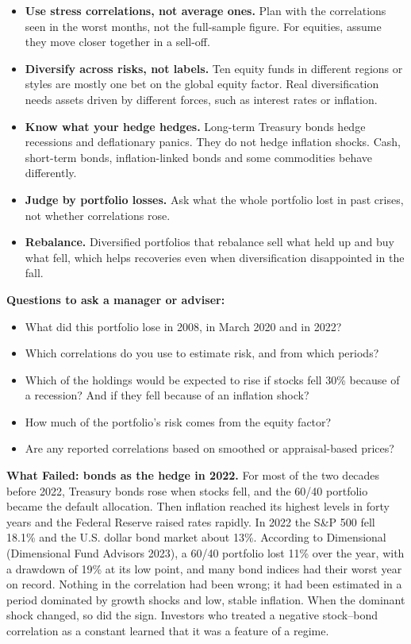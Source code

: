 \begin{itemize}
  \item \textbf{Use stress correlations, not average ones.} Plan with the correlations seen in the worst months, not the full-sample figure. For equities, assume they move closer together in a sell-off.
  \item \textbf{Diversify across risks, not labels.} Ten equity funds in different regions or styles are mostly one bet on the global equity factor. Real diversification needs assets driven by different forces, such as interest rates or inflation.
  \item \textbf{Know what your hedge hedges.} Long-term Treasury bonds hedge recessions and deflationary panics. They do not hedge inflation shocks. Cash, short-term bonds, inflation-linked bonds and some commodities behave differently.
  \item \textbf{Judge by portfolio losses.} Ask what the whole portfolio lost in past crises, not whether correlations rose.
  \item \textbf{Rebalance.} Diversified portfolios that rebalance sell what held up and buy what fell, which helps recoveries even when diversification disappointed in the fall.
\end{itemize}

\textbf{Questions to ask a manager or adviser:}

\begin{itemize}
  \item What did this portfolio lose in 2008, in March 2020 and in 2022?
  \item Which correlations do you use to estimate risk, and from which periods?
  \item Which of the holdings would be expected to rise if stocks fell 30\% because of a recession? And if they fell because of an inflation shock?
  \item How much of the portfolio's risk comes from the equity factor?
  \item Are any reported correlations based on smoothed or appraisal-based prices?
\end{itemize}

\begin{callout}
\textbf{What Failed: bonds as the hedge in 2022.} For most of the two decades before 2022, Treasury bonds rose when stocks fell, and the 60/40 portfolio became the default allocation. Then inflation reached its highest levels in forty years and the Federal Reserve raised rates rapidly. In 2022 the S\&P 500 fell 18.1\% and the U.S. dollar bond market about 13\%. According to Dimensional (Dimensional Fund Advisors 2023), a 60/40 portfolio lost 11\% over the year, with a drawdown of 19\% at its low point, and many bond indices had their worst year on record. Nothing in the correlation had been wrong; it had been estimated in a period dominated by growth shocks and low, stable inflation. When the dominant shock changed, so did the sign. Investors who treated a negative stock--bond correlation as a constant learned that it was a feature of a regime.
\end{callout}

